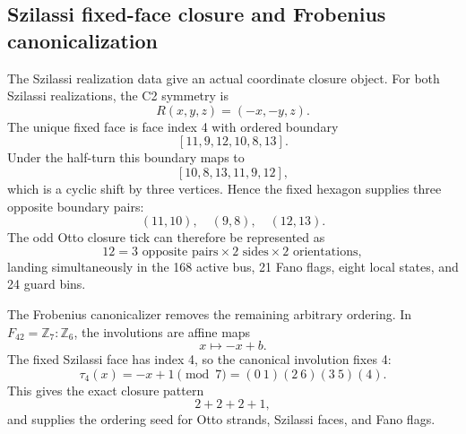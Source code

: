 \subsection{Szilassi fixed-face closure and Frobenius canonicalization}
\label{sec:bt1444-bt1446-szilassi-closure-canonicalizer}

The Szilassi realization data give an actual coordinate closure object.  For
both Szilassi realizations, the C2 symmetry is
\[
R(x,y,z)=(-x,-y,z).
\]
The unique fixed face is face index 4 with ordered boundary
\[
[11,9,12,10,8,13].
\]
Under the half-turn this boundary maps to
\[
[10,8,13,11,9,12],
\]
which is a cyclic shift by three vertices.  Hence the fixed hexagon supplies
three opposite boundary pairs:
\[
(11,10),\quad(9,8),\quad(12,13).
\]
The odd Otto closure tick can therefore be represented as
\[
12=3\text{ opposite pairs}\times2\text{ sides}\times2\text{ orientations},
\]
landing simultaneously in the 168 active bus, 21 Fano flags, eight local states,
and 24 guard bins.

The Frobenius canonicalizer removes the remaining arbitrary ordering.  In
\(F_{42}=\mathbb Z_7:\mathbb Z_6\), the involutions are affine maps
\[
x\mapsto -x+b.
\]
The fixed Szilassi face has index 4, so the canonical involution fixes 4:
\[
\tau_4(x)=-x+1\pmod 7=(0\ 1)(2\ 6)(3\ 5)(4).
\]
This gives the exact closure pattern
\[
2+2+2+1,
\]
and supplies the ordering seed for Otto strands, Szilassi faces, and Fano flags.
